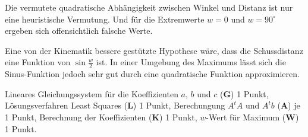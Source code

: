 \begin{diskussion}
Die vermutete quadratische Abhängigkeit zwischen Winkel und Distanz
ist nur eine heuristische Vermutung.
Und für die Extremwerte $w=0$ und $w=90^\circ$ ergeben sich offensichtlich
falsche Werte.

Eine von der Kinematik bessere gestützte Hypothese wäre, dass
die Schussdistanz eine Funktion von $\sin \frac{w}2$ ist.
In einer Umgebung des Maximums lässt sich die Sinus-Funktion jedoch
sehr gut durch eine quadratische Funktion approximieren.
\end{diskussion}

\begin{bewertung}
Lineares Gleichungssystem für die Koeffizienten $a$, $b$ und $c$ ({\bf G})
1 Punkt,
Lösungsverfahren Least Squares ({\bf L}) 1 Punkt,
Berechungung $A^tA$ und $A^tb$ ({\bf A}) je 1 Punkt,
Berechnung der Koeffizienten ({\bf K}) 1 Punkt,
$w$-Wert für Maximum ({\bf W}) 1 Punkt.
\end{bewertung}

